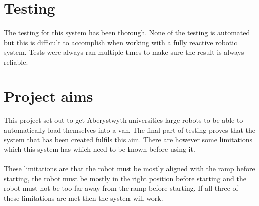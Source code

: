\section{Testing}
\paragraph{}
The testing for this system has been thorough. None of the testing is automated but this is difficult to accomplish when working with a fully reactive robotic system. Tests were always ran multiple times to make sure the result is always reliable.

\section{Project aims}
\paragraph{}
This project set out to get Aberystwyth universities large robots to be able to automatically load themselves into a van. The final part of testing proves that the system that has been created fulfils this aim. There are however some limitations which this system has which need to be known before using it.

\paragraph{}
These limitations are that the robot must be mostly aligned with the ramp before starting, the robot must be mostly in the right position before starting and the robot must not be too far away from the ramp before starting. If all three of these limitations are met then the system will work.


